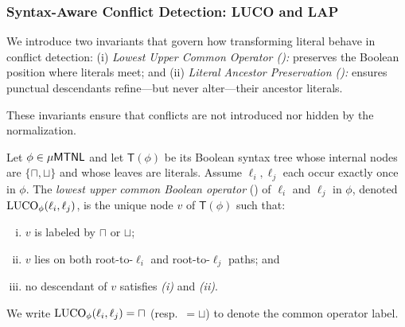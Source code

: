 \subsubsection{Syntax-Aware Conflict Detection: LUCO and LAP}


 

We introduce two invariants that govern how transforming literal behave in conflict detection: (i)  \emph{Lowest Upper Common Operator (\LUCO):} preserves the Boolean position where literals meet; and (ii) \emph{Literal Ancestor Preservation (\LAP):} ensures punctual descendants refine—but never alter—their ancestor literals.

These invariants ensure that conflicts are not introduced nor hidden by the  \dpnf normalization.

\begin{definition}\label{def:luco-unique}
Let $\phi\in\mathsf{\mu MTNL}$ and let $\mathsf{T}(\phi)$ be its Boolean syntax tree whose internal
nodes are $\{\sqcap,\sqcup\}$ and whose leaves are literals.
Assume $\ell_i,\ell_j$ each occur exactly once in $\phi$.
The \emph{lowest upper common Boolean operator} (\LUCO) of $\ell_i$ and $\ell_j$ in $\phi$,
denoted $\mathrm{LUCO}_\phi(\ell_i,\ell_j)$, is the unique node $v$ of $\mathsf{T}(\phi)$ such that:
\begin{enumerate}[(i)]
    \item $v$ is labeled by $\sqcap$ or $\sqcup$;
    \item $v$ lies on both root-to-$\ell_i$ and root-to-$\ell_j$ paths; and
    \item no descendant of $v$ satisfies \emph{(i)} and \emph{(ii)}.
\end{enumerate}
We write $\mathrm{LUCO}_\phi(\ell_i,\ell_j)=\sqcap$ (resp.\ $=\sqcup$) to denote the common operator label.
\end{definition}


